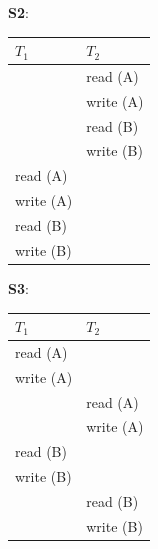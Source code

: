 \documentclass[12pt]{article}
\begin{document}
    \noindent \textbf{S2}:
    \begin{table}[H]
        \begin{center}
            \begin{tabular}{| p{6cm} | p{6cm} |}
                \hline
                $T_1$ & $T_2$\\
                \hline
                \hline
                & read (A)\\
                \hline
                & write (A)\\
                \hline
                & read (B)\\
                \hline
                & write (B)\\
                \hline
                read (A) &\\
                \hline
                write (A) &\\
                \hline
                read (B)&\\
                \hline
                write (B)&\\
                \hline
            \end{tabular}
        \end{center}
    \end{table}

    \noindent \textbf{S3}:
    \begin{table}[H]
        \begin{center}
            \begin{tabular}{| p{6cm} | p{6cm} |}
                \hline
                $T_1$ & $T_2$\\
                \hline
                \hline
                read (A) &\\
                \hline
                write (A) &\\
                \hline
                & read (A)\\
                \hline
                & write (A)\\
                \hline
                read (B)&\\
                \hline
                write (B)&\\
                \hline
                & read (B)\\
                \hline
                & write (B)\\
                \hline
            \end{tabular}
        \end{center}
    \end{table}
\end{document}
